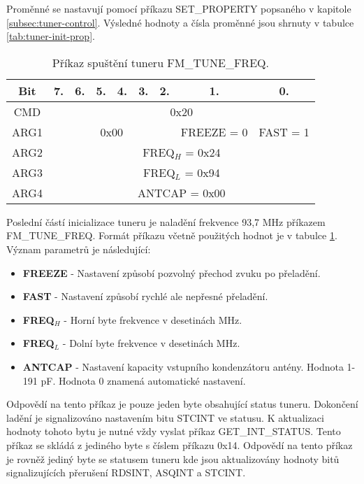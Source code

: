 Proměnné se nastavují pomocí příkazu SET\_PROPERTY popsaného v kapitole \ref{subsec:tuner-control}. Výsledné hodnoty a čísla proměnné jsou shrnuty v tabulce \ref{tab:tuner-init-prop}.

\begin{table}[ht!]
\begin{center}
\begin{tabular}{|c|c|c|c|c|c|c|c|c|}
\hline 
Bit & 7. & 6. & 5. & 4. & 3. & 2. & 1. & 0. \\ 
\hline 
CMD & \multicolumn{8}{c|}{0x20} \\ 
\hline 
ARG1 & \multicolumn{6}{c|}{0x00} & FREEZE = 0 & FAST = 1 \\ 
\hline 
ARG2 & \multicolumn{8}{c|}{FREQ$_{{H}}$ = 0x24} \\ 
\hline 
ARG3 & \multicolumn{8}{c|}{FREQ$_{{L}}$ = 0x94} \\ 
\hline 
ARG4 & \multicolumn{8}{c|}{ANTCAP = 0x00} \\ 
\hline 
\end{tabular} 
\end{center}
\caption{Příkaz spuštění tuneru FM\_TUNE\_FREQ.}
\label{tab:tuner-tune-freq} 
\end{table}

Poslední částí inicializace tuneru je naladění frekvence 93,7 MHz příkazem FM\_TUNE\_FREQ. Formát příkazu včetně použitých hodnot je v tabulce \ref{tab:tuner-tune-freq}. Význam parametrů je následující:

\begin{itemize}
\item \textbf{FREEZE} - Nastavení způsobí pozvolný přechod zvuku po přeladění.
\item \textbf{FAST} - Nastavení způsobí rychlé ale nepřesné přeladění.
\item \textbf{FREQ$_{{H}}$} - Horní byte frekvence v desetinách MHz.
\item \textbf{FREQ$_{{L}}$} - Dolní byte frekvence v desetinách MHz.
\item \textbf{ANTCAP} - Nastavení kapacity vstupního kondenzátoru antény. Hodnota 1-191 pF. Hodnota 0 znamená automatické nastavení.
\end{itemize}

Odpovědí na tento příkaz je pouze jeden byte obsahující status tuneru. Dokončení ladění je signalizováno nastavením bitu STCINT ve statusu. K aktualizaci hodnoty tohoto bytu je nutné vždy vyslat příkaz GET\_INT\_STATUS. Tento příkaz se skládá z jediného byte s číslem příkazu 0x14. Odpovědí na tento příkaz je rovněž jediný byte se statusem tuneru kde jsou aktualizovány hodnoty bitů signalizujících přerušení RDSINT, ASQINT a STCINT.


